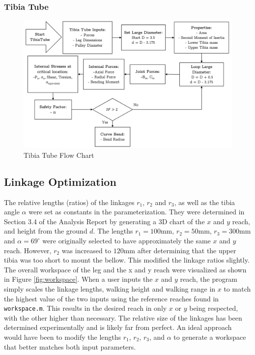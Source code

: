 \subsubsection{Tibia Tube} \label{app_subsec:tube_flowchart}

\begin{figure}[H]
    \centering
    \includegraphics[width=\textwidth]{6_Appendices/Flowcharts/TibiaFlowChart.png}
    \caption{Tibia Tube Flow Chart}
    \label{fig:tube_flowchart}
\end{figure}{}

\subsection{Linkage Optimization} \label{app_sub:linkages}

The relative lengths (ratios) of the linkages $r_1$, $r_2$ and $r_3$, as well as the tibia angle $\alpha$ were set as constants in the parameterization. They were determined in Section 3.4 of the Analysis Report by generating a 3D chart of the $x$ and $y$ reach, and height from the ground $d$.
The lengths $r_1=100\text{mm}$, $r_2=50\text{mm}$, $r_3=300\text{mm}$ and $\alpha=69^{\circ}$ were originally selected to have approximately the same $x$ and $y$ reach. However, $r_2$ was increased to $120\text{mm}$ after determining that the upper tibia was too short to mount the bellow. This modified the linkage ratios slightly.
The overall workspace of the leg and the x and y reach were visualized as shown in Figure \ref{fig:workspace}.
When a user inputs the $x$ and $y$ reach, the program simply scales the linkage lengths, walking height and walking range in $x$ to match the highest value of the two inputs using the reference reaches found in \texttt{workspace.m}.
This results in the desired reach in only $x$ or $y$ being respected, with the other higher than necessary.
The relative size of the linkages has been determined experimentally and is likely far from perfect.
An ideal approach would have been to modify the lengths $r_1$, $r_2$, $r_3$, and $\alpha$ to generate a workspace that better matches both input parameters.

